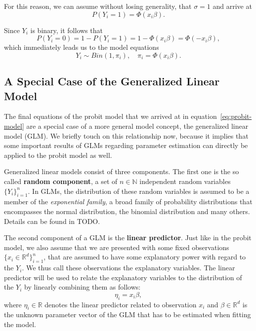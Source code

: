For this reason, we can assume without losing generality, that
$\sigma = 1$ and arrive at
\begin{equation}
    P(Y_i = 1) = \Phi(x_i \beta).
\end{equation}

\noindent{}Since $Y_i$ is binary, it follows that
\begin{equation*}
    P(Y_i = 0) = 1 - P(Y_i = 1) = 1 - \Phi(x_i \beta) = \Phi(-x_i \beta),
\end{equation*}
which immediately leads us to the model equations
\begin{equation}
    \label{eq:probit-model}
    Y_i \sim Bin(1, \pi_i), \quad \pi_i = \Phi(x_i \beta).
\end{equation}

\subsection{A Special Case of the Generalized Linear Model}

The final equations of the probit model that we arrived at
in equation~\ref{eq:probit-model} are a special case of a more
general model concept, the generalized linear model (GLM).
We briefly touch on this relationship now, because it implies
that some important results of GLMs regarding parameter
estimation can directly be applied to the probit model as well.

Generalized linear models consist of three components.
The first one is the so called \textbf{random component},
a set of $n \in \mathbb{N}$ independent random variables $\{ Y_i \}_{i=1}^n$.
In GLMs, the distribution of these random variables is assumed
to be a member of the \textit{exponential family}, a broad family of
probability distributions that encompasses the normal distribution,
the binomial distribution and many others.
Details can be found in TODO.

The second component of a GLM is the \textbf{linear predictor}.
Just like in the probit model, we also assume that we are
presented with some fixed observations $\{x_i \in \mathbb{R}^d\}_{i=1}^n$,
that are assumed to have some explanatory power with regard to
the $Y_i$. We thus call these observations the explanatory variables.
The linear predictor will be used to relate the explanatory variables
to the distribution of the $Y_i$ by linearly combining them as follows:
\begin{equation*}
    \eta_i = x_i \beta,
\end{equation*}
where $\eta_i \in \mathbb{R}$ denotes the linear predictor related
to observation $x_i$ and
$\beta \in \mathbb{R}^d$ is the unknown parameter vector of the GLM
that has to be estimated when fitting the model.

